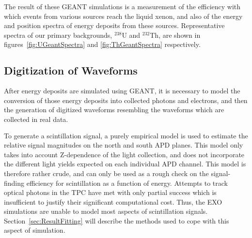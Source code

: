 The result of these GEANT simulations is a measurement of the efficiency with which events from various sources reach the liquid xenon, and also of the energy and position spectra of energy deposits from these sources.  Representative spectra of our primary backgrounds, $^{238}$U and $^{232}$Th, are shown in figures~\ref{fig:UGeantSpectra} and \ref{fig:ThGeantSpectra} respectively.

\subsection{Digitization of Waveforms}\label{sec:ResultsDigitization}

After energy deposits are simulated using GEANT, it is necessary to model the conversion of those energy deposits into collected photons and electrons, and then the generation of digitized waveforms resembling the waveforms which are collected in real data.

To generate a scintillation signal, a purely empirical model is used to estimate the relative signal magnitudes on the north and south APD planes.  This model only takes into account Z-dependence of the light collection, and does not incorporate the different light yields expected on each individual APD channel.  This model is therefore rather crude, and can only be used as a rough check on the signal-finding efficiency for scintillation as a function of energy.  Attempts to track optical photons in the TPC have met with only partial success which is insufficient to justify their significant computational cost.  Thus, the EXO simulations are unable to model most aspects of scintillation signals.  Section~\ref{sec:ResultFitting} will describe the methods used to cope with this aspect of simulation.

